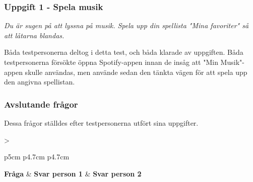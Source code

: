 \documentclass[a4paper,12pt,titlepage]{article}
\begin{document}
\subsubsection*{Uppgift 1 - Spela musik}

\textit{%
Du är sugen på att lyssna på musik. Spela upp din spellista "Mina favoriter" så
att låtarna blandas.
}

Båda testpersonerna deltog i detta test, och båda klarade av uppgiften. Båda
testpersonerna försökte öppna Spotify-appen innan de insåg att "Min
Musik"-appen skulle användas, men använde sedan den tänkta vägen för att spela
upp den angivna spellistan.

\subsubsection*{Avslutande frågor}

Dessa frågor ställdes efter testpersonerna utfört sina uppgifter.

\begin{longtable}[c]{>\raggedright p{5cm} p{4.7cm} p{4.7cm} }
    \textbf{Fråga} & \textbf{Svar person 1} & \textbf{Svar person 2} \\
    \midrule
\end{longtable}
\end{document}
